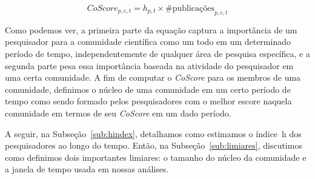 \begin{equation}
  \label{eq:core_score}
  \textit{CoScore}_{p,c,t} = h_{p,t} \times \textrm{\#}\text{publicações}_{p,c,t}
\end{equation}

% 

Como podemos ver, a primeira parte da equação captura a importância de um pesquisador para 
a comunidade científica como um todo em um determinado período de tempo, independentemente 
de qualquer área de pesquisa específica, e a segunda parte pesa essa importância baseada na 
atividade do pesquisador em uma certa comunidade. A fim de computar o \textit{CoScore} para 
os membros de uma comunidade, definimos o núcleo de uma comunidade em um certo período de tempo 
como sendo formado pelos pesquisadores com o melhor escore naquela comunidade em termos de 
seu \textit{CoScore} em um dado período. 

A seguir, na Subseção~\ref{sub:hindex}, detalhamos como estimamos o índice~h dos pesquisadores 
ao longo do tempo. Então, na Subseção~\ref{sub:limiares}, discutimos como definimos dois 
importantes limiares: o tamanho do núcleo da comunidade e a janela de tempo usada em nossas análises.

